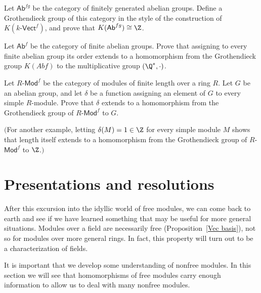 \begin{exercise}
Let $\mathsf{Ab}^{fg}$ be the category of finitely generated abelian groups. Define a Grothendieck group of this category in the style of the construction of $K(\text{$k$-$\mathsf{Vect}^{f}$})$, and prove that $K(\mathsf{Ab}^{fg})\cong\Z$.
\end{exercise}
\begin{exercise}
Let $\mathsf{Ab}^{f}$ be the category of finite abelian groups. Prove that assigning to every finite abelian group its order extends to a homomorphism from the Grothendieck group $K(Abf)$ to the multiplicative group $(\Q^*,\cdot)$.
\end{exercise}
\begin{exercise}
Let $R$-$\mathsf{Mod}^f$ be the category of modules of finite length over a ring $R$. Let $G$ be an abelian group, and let $\delta$ be a function assigning an element of $G$ to every simple $R$-module. Prove that $\delta$ extends to a homomorphism from the Grothendieck group of $R$-$\mathsf{Mod}^f$ to $G$.\par
$($For another example, letting $\delta(M)=1\in\Z$ for every simple module $M$ shows that length itself extends to a homomorphism from the Grothendieck group of $R$-$\mathsf{Mod}^f$ to $\Z$.$)$
\end{exercise}
\section{Presentations and resolutions}
After this excursion into the idyllic world of free modules, we can come back to earth and see if we have learned something that may be useful for more general situations. Modules over a field are necessarily free (Proposition~\ref{Vec basis}), not so for modules over more general rings. In fact, this property will turn out to be a characterization of fields.\par
It is important that we develop some understanding of nonfree modules. In this section we will see that homomorphisms of free modules carry enough information to allow us to deal with many nonfree modules.
